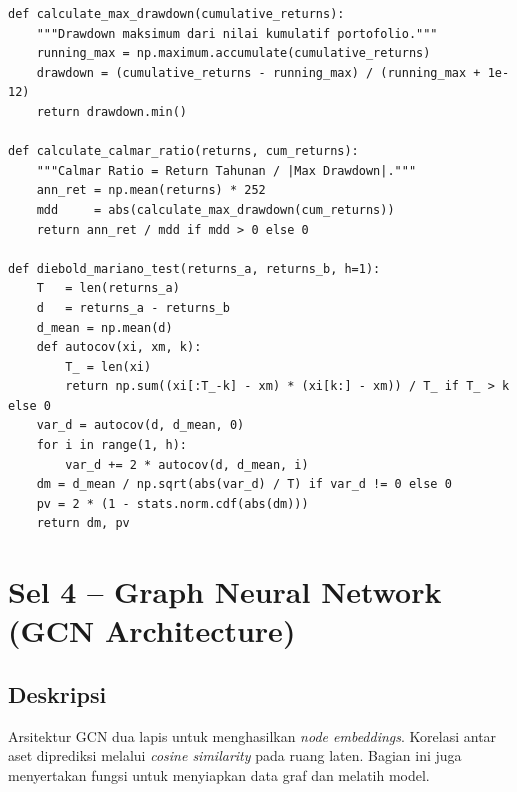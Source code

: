 \documentclass[12pt,a4paper]{article}
\begin{document}
\begin{lstlisting}[caption={Helper functions dan metrik risiko}]
def calculate_max_drawdown(cumulative_returns):
    """Drawdown maksimum dari nilai kumulatif portofolio."""
    running_max = np.maximum.accumulate(cumulative_returns)
    drawdown = (cumulative_returns - running_max) / (running_max + 1e-12)
    return drawdown.min()

def calculate_calmar_ratio(returns, cum_returns):
    """Calmar Ratio = Return Tahunan / |Max Drawdown|."""
    ann_ret = np.mean(returns) * 252
    mdd     = abs(calculate_max_drawdown(cum_returns))
    return ann_ret / mdd if mdd > 0 else 0

def diebold_mariano_test(returns_a, returns_b, h=1):
    T   = len(returns_a)
    d   = returns_a - returns_b
    d_mean = np.mean(d)
    def autocov(xi, xm, k):
        T_ = len(xi)
        return np.sum((xi[:T_-k] - xm) * (xi[k:] - xm)) / T_ if T_ > k else 0
    var_d = autocov(d, d_mean, 0)
    for i in range(1, h):
        var_d += 2 * autocov(d, d_mean, i)
    dm = d_mean / np.sqrt(abs(var_d) / T) if var_d != 0 else 0
    pv = 2 * (1 - stats.norm.cdf(abs(dm)))
    return dm, pv
\end{lstlisting}

\section{Sel 4 -- Graph Neural Network (GCN Architecture)}

\subsection{Deskripsi}
Arsitektur GCN dua lapis untuk menghasilkan \textit{node embeddings}. Korelasi 
antar aset diprediksi melalui \textit{cosine similarity} pada ruang laten. Bagian 
ini juga menyertakan fungsi untuk menyiapkan data graf dan melatih model.
\end{document}
